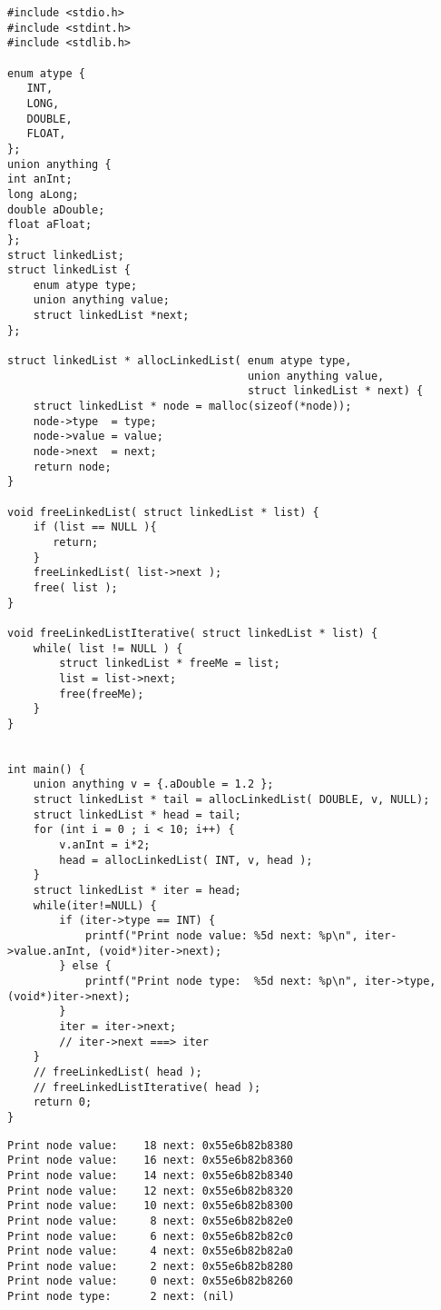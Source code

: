 \documentclass[11pt]{article}
\begin{document}
\begin{verbatim}
#include <stdio.h>
#include <stdint.h>
#include <stdlib.h>

enum atype {
   INT,
   LONG,
   DOUBLE,
   FLOAT,
};
union anything {
int anInt;
long aLong;
double aDouble;
float aFloat;
};
struct linkedList;
struct linkedList { 
    enum atype type;
    union anything value;
    struct linkedList *next; 
};

struct linkedList * allocLinkedList( enum atype type, 
                                     union anything value, 
                                     struct linkedList * next) {
    struct linkedList * node = malloc(sizeof(*node));
    node->type  = type;
    node->value = value;
    node->next  = next;
    return node;
}

void freeLinkedList( struct linkedList * list) {
    if (list == NULL ){
       return;
    }
    freeLinkedList( list->next );
    free( list );
}

void freeLinkedListIterative( struct linkedList * list) {
    while( list != NULL ) {
        struct linkedList * freeMe = list;
        list = list->next;
        free(freeMe);
    }
}


int main() {
    union anything v = {.aDouble = 1.2 };
    struct linkedList * tail = allocLinkedList( DOUBLE, v, NULL);
    struct linkedList * head = tail;
    for (int i = 0 ; i < 10; i++) {
        v.anInt = i*2;
        head = allocLinkedList( INT, v, head );
    }
    struct linkedList * iter = head;
    while(iter!=NULL) {
        if (iter->type == INT) {
            printf("Print node value: %5d next: %p\n", iter->value.anInt, (void*)iter->next);
        } else {
            printf("Print node type:  %5d next: %p\n", iter->type, (void*)iter->next);
        }
        iter = iter->next;
        // iter->next ===> iter
    }    
    // freeLinkedList( head );
    // freeLinkedListIterative( head );
    return 0;
}
\end{verbatim}

\begin{verbatim}
Print node value:    18 next: 0x55e6b82b8380
Print node value:    16 next: 0x55e6b82b8360
Print node value:    14 next: 0x55e6b82b8340
Print node value:    12 next: 0x55e6b82b8320
Print node value:    10 next: 0x55e6b82b8300
Print node value:     8 next: 0x55e6b82b82e0
Print node value:     6 next: 0x55e6b82b82c0
Print node value:     4 next: 0x55e6b82b82a0
Print node value:     2 next: 0x55e6b82b8280
Print node value:     0 next: 0x55e6b82b8260
Print node type:      2 next: (nil)
\end{verbatim}
\end{document}
